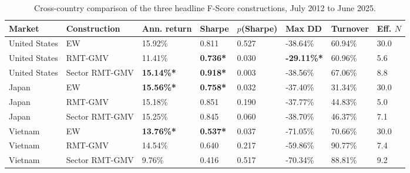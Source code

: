 \documentclass[11pt,a4paper]{report}
\numberwithin{figure}{chapter}
\numberwithin{table}{chapter}
\numberwithin{equation}{chapter}
\begin{document}
\begin{table}[H]
\centering
\scriptsize
\caption{Cross-country comparison of the three headline F-Score constructions, July 2012 to June 2025.}
\label{tab:cross_country_headline}

\setlength{\tabcolsep}{2.5pt}

\begin{tabular}{
@{}
M{0.13\textwidth}
M{0.18\textwidth}
M{0.105\textwidth}
M{0.08\textwidth}
M{0.09\textwidth}
M{0.105\textwidth}
M{0.105\textwidth}
M{0.07\textwidth}
@{}
}
\hline
\textbf{Market} &
\textbf{Construction} &
\textbf{Ann. return} &
\textbf{Sharpe} &
\textbf{$p$(Sharpe)} &
\textbf{Max DD} &
\textbf{Turnover} &
\textbf{Eff. $N$} \\
\hline

United States
& EW
& 15.92\%
& 0.811
& 0.527
& -38.64\%
& 60.94\%
& 30.0 \\
\hline{}

United States
& RMT-GMV
& 11.41\%
& \textbf{0.736*}
& 0.030
& \textbf{-29.11\%*}
& 60.96\%
& 5.6 \\
\hline{}

United States
& Sector RMT-GMV
& \textbf{15.14\%*}
& \textbf{0.918*}
& 0.003
& -38.56\%
& 67.06\%
& 8.8 \\
\hline{}

Japan
& EW
& \textbf{15.56\%*}
& \textbf{0.758*}
& 0.032
& -37.40\%
& 31.34\%
& 30.0 \\
\hline{}

Japan
& RMT-GMV
& 15.18\%
& 0.851
& 0.190
& -37.77\%
& 44.83\%
& 5.0 \\
\hline{}

Japan
& Sector RMT-GMV
& 15.25\%
& 0.845
& 0.060
& -38.70\%
& 46.37\%
& 7.1 \\
\hline{}

Vietnam
& EW
& \textbf{13.76\%*}
& \textbf{0.537*}
& 0.037
& -71.05\%
& 70.66\%
& 30.0 \\
\hline{}

Vietnam
& RMT-GMV
& 14.54\%
& 0.640
& 0.217
& -59.86\%
& 90.77\%
& 7.4 \\
\hline{}

Vietnam
& Sector RMT-GMV
& 9.76\%
& 0.416
& 0.517
& -70.34\%
& 88.81\%
& 9.2 \\

\hline
\end{tabular}
\end{table}
\end{document}
